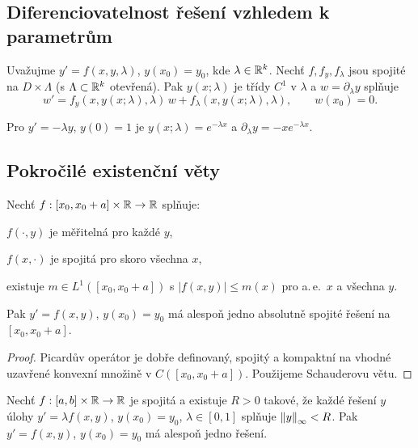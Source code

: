 \spc

\subsection{Diferenciovatelnost řešení vzhledem k parametrům}
\label{sec:diff-parametry}

\begin{theorem}
\label{vet:zavislost-parametry}
Uvažujme $y'=f(x,y,\lambda)$, $y(x_0)=y_0$, kde $\lambda\in\mathbb{R}^k$. 
Nechť $f,f_y,f_\lambda$ jsou spojité na $D\times\Lambda$ (s $\Lambda\subset\mathbb{R}^k$ otevřená). 
Pak $y(x;\lambda)$ je třídy $C^1$ v $\lambda$ a $w=\partial_\lambda y$ splňuje
\[
w' = f_y(x,y(x;\lambda),\lambda)\,w + f_\lambda(x,y(x;\lambda),\lambda),\qquad w(x_0)=0.
\]
\end{theorem}

\begin{example}
\label{ex:citlivost-parametry}
Pro $y'=-\lambda y$, $y(0)=1$ je $y(x;\lambda)=e^{-\lambda x}$ a $\partial_\lambda y=-x e^{-\lambda x}$.
\end{example}

\spc

\subsection{Pokročilé existenční věty}
\label{sec:pokrocile-existenci}

\begin{theorem}
\label{vet:caratheodory}
Nechť $f:[x_0,x_0+a]\times\mathbb{R}\to\mathbb{R}$ splňuje:
\begin{romanenum}
\item $f(\cdot,y)$ je měřitelná pro každé $y$,
\item $f(x,\cdot)$ je spojitá pro skoro všechna $x$,
\item existuje $m\in L^1([x_0,x_0+a])$ s $|f(x,y)|\le m(x)$ pro a.\,e.\ $x$ a všechna $y$.
\end{romanenum}
Pak $y'=f(x,y)$, $y(x_0)=y_0$ má alespoň jedno absolutně spojité řešení na $[x_0,x_0+a]$.
\end{theorem}

\begin{proof}
Picardův operátor je dobře definovaný, spojitý a kompaktní na vhodné uzavřené konvexní množině v $C([x_0,x_0+a])$. Použijeme Schauderovu větu.
\end{proof}

\begin{theorem}
\label{vet:existence-schauder}
Nechť $f:[a,b]\times\mathbb{R}\to\mathbb{R}$ je spojitá a existuje $R>0$ takové, že každé řešení $y$ úlohy $y'=\lambda f(x,y)$, $y(x_0)=y_0$, $\lambda\in[0,1]$ splňuje $\left\lVert y \right\rVert_\infty<R$. 
Pak $y'=f(x,y)$, $y(x_0)=y_0$ má alespoň jedno řešení.
\end{theorem}

